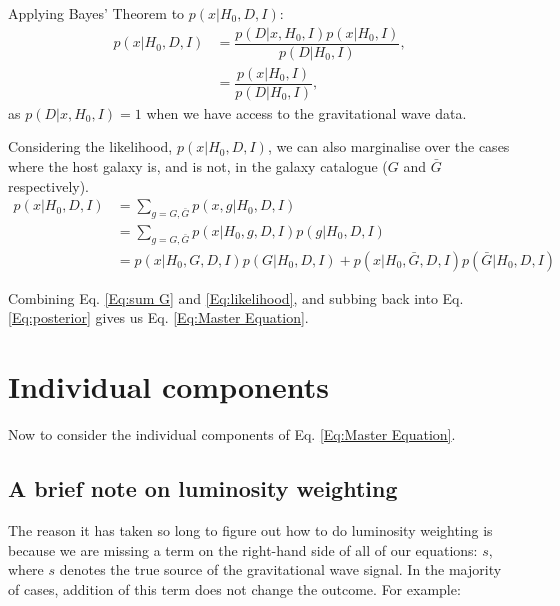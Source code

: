\documentclass[a4paper,10pt]{article}
\begin{document}
Applying Bayes' Theorem to $p(x|H_0,D,I)$:
\begin{equation} \label{Eq:likelihood}
\begin{aligned}
p(x|H_0,D,I) &= \dfrac{p(D|x,H_0,I)p(x|H_0,I)}{p(D|H_0,I)},
\\ &= \dfrac{p(x|H_0,I)}{p(D|H_0,I)},
\end{aligned} 
\end{equation}
as $p(D|x,H_0,I)=1$ when we have access to the gravitational wave data.

Considering the likelihood, $p(x|H_0,D,I)$, we can also marginalise over the cases where the host galaxy is, and is not, in the galaxy catalogue ($G$ and $\bar{G}$ respectively).
\begin{equation} \label{Eq:sum G}
\begin{aligned}
p(x|H_0,D,I) &= \sum_{g=G,\bar{G}} p(x,g|H_0,D,I)
\\ &= \sum_{g=G,\bar{G}} p(x|H_0,g,D,I) p(g|H_0,D,I)
\\ &= p(x|H_0,G,D,I) p(G|H_0,D,I) + p(x|H_0,\bar{G},D,I) p(\bar{G}|H_0,D,I)
\end{aligned} 
\end{equation}

Combining Eq. \ref{Eq:sum G} and \ref{Eq:likelihood}, and subbing back into Eq. \ref{Eq:posterior} gives us Eq. \ref{Eq:Master Equation}.


\section{Individual components}
Now to consider the individual components of Eq. \ref{Eq:Master Equation}.


\subsection{A brief note on luminosity weighting}
The reason it has taken so long to figure out how to do luminosity weighting is because we are missing a term on the right-hand side of all of our equations: $s$, where $s$ denotes the true source of the gravitational wave signal.  In the majority of cases, addition of this term does not change the outcome.  For example:
\end{document}
